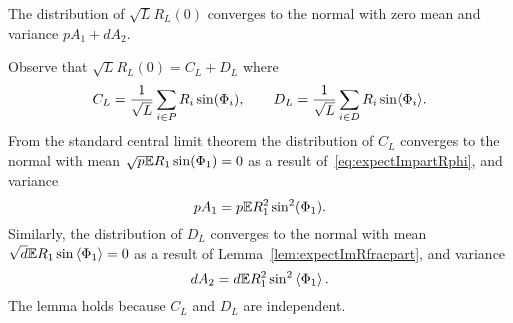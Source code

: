 \documentclass[journal]{IEEEtran}
\begin{document}
\begin{lemma}\label{lem:convdistGLdash}
The distribution of $\sqrt{L}R_L(0)$ converges to the normal with zero mean and variance $pA_1 + dA_2$.
\end{lemma}
\begin{IEEEproof}
Observe that $\sqrt{L} R_L(0) = C_L + D_L$ where
\[
C_L = \frac{1}{\sqrt{L}} \sum_{i \in P} R_i \sin(\Phi_i), \qquad D_L = \frac{1}{\sqrt{L}} \sum_{i \in D} R_i \sin\langle \Phi_i \rangle.
\]
From the standard central limit theorem the distribution of $C_L$ converges to the normal with mean $\sqrt{p}{\mathbb E} R_1 \sin(\Phi_1) = 0$ as a result of~\eqref{eq:expectImpartRphi}, and variance
\[
p A_1 = p {\mathbb E} R_1^2 \sin^2(\Phi_1).
\]
Similarly, the distribution of $D_L$ converges to the normal with mean $\sqrt{d}{\mathbb E} R_1 \sin\left\langle \Phi_1 \right\rangle = 0$ as a result of Lemma~\ref{lem:expectImRfracpart}, and variance
\[
d A_2 = d {\mathbb E} R_1^2 \sin^2\left\langle \Phi_1 \right\rangle.
\]
The lemma holds because $C_L$ and $D_L$ are independent. 
\end{IEEEproof}
\end{document}
